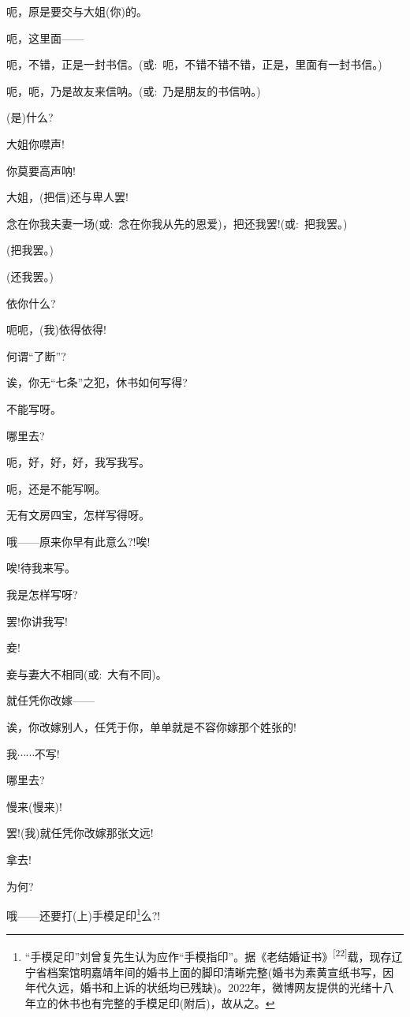 {{呃，原是要交与大姐(你)的。}

{呃，这里面------}

{呃，不错，正是一封书信。(或:~呃，不错不错不错，正是，里面有一封书信。)}

{呃，呃，乃是故友来信呐。(或:~乃是朋友的书信呐。)}

{(是)什么?}\hspace{10pt}~

{大姐你噤声!}

{你莫要高声呐!}

{大姐，(把信)还与卑人罢!}

{念在你我夫妻一场(或:~念在你我从先的恩爱)，把还我罢!(或:~把我罢。)}

{(把我罢。)}

{(还我罢。)}

{依你什么?}

{呃呃，(我)依得依得!}

{何谓``了断''?}

{诶，你无``七条''之犯，休书如何写得?}

{不能写呀。}

{哪里去?}\hspace{10pt}~

{呃，好，好，好，我写我写。}

{呃，还是不能写啊。}

{无有文房四宝，怎样写得呀。}

{哦------原来你早有此意么?!唉!}

{唉!待我来写。}

{我是怎样写呀?}

{罢!你讲我写!}

{妾!}\hspace{30pt}~

{妾与妻大不相同(或:~大有不同)。}

{就任凭你改嫁------}

{诶，你改嫁别人，任凭于你，单单就是不容你嫁那个姓张的!}

{我$\cdots{}\cdots{}$不写!}

{哪里去?}\hspace{10pt}~

{慢来(慢来)!}

{罢!(我)就任凭你改嫁那张文远!}

{拿去!}\hspace{20pt}~

{为何?}\hspace{20pt}~

{哦------还要打(上)手模足印}\footnote{``手模足印''刘曾复先生认为应作``手模指印''。据《老结婚证书》\textsuperscript{{[}22{]}}载，现存辽宁省档案馆明嘉靖年间的婚书上面的脚印清晰完整(婚书为素黄宣纸书写，因年代久远，婚书和上诉的状纸均已残缺)。2022年，微博网友提供的光绪十八年立的休书也有完整的手模足印(附后)，故从之。}{么?!}

}
